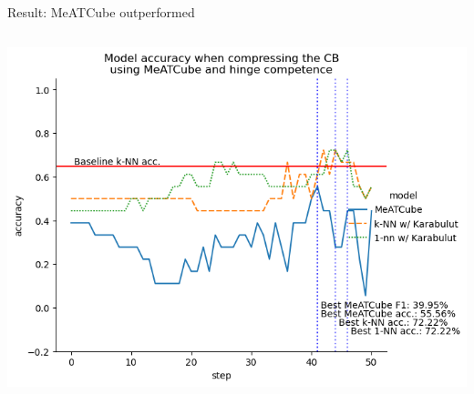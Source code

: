 \documentclass[]{beamer}
\begin{document}
\begin{frame}{Result: MeATCube outperformed}
\begin{columns}
\begin{column}{.65\textwidth}
            \includegraphics[width=.8\textwidth]{../results-weight-estim+/figs/post+operative+patient.png}
        \end{column}
    \end{columns}
\end{frame}
\end{document}
